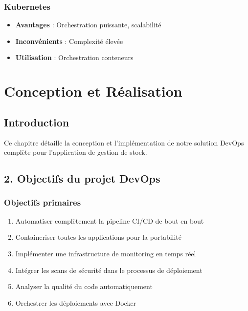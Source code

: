\documentclass[12pt,a4paper]{report}
\begin{document}
\subsection{Kubernetes}

\begin{itemize}
    \item \textbf{Avantages} : Orchestration puissante, scalabilité
    \item \textbf{Inconvénients} : Complexité élevée
    \item \textbf{Utilisation} : Orchestration conteneurs
\end{itemize}

\newpage

\chapter{Conception et Réalisation}

\section{Introduction}

Ce chapitre détaille la conception et l'implémentation de notre solution DevOps complète pour l'application de gestion de stock.

\section{2. Objectifs du projet DevOps}

\subsection{Objectifs primaires}

\begin{enumerate}
    \item Automatiser complètement la pipeline CI/CD de bout en bout
    \item Containeriser toutes les applications pour la portabilité
    \item Implémenter une infrastructure de monitoring en temps réel
    \item Intégrer les scans de sécurité dans le processus de déploiement
    \item Analyser la qualité du code automatiquement
    \item Orchestrer les déploiements avec Docker
\end{enumerate}
\end{document}
